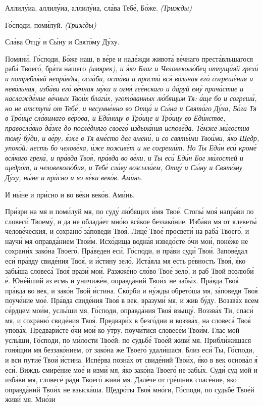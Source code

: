    Аллилу́иа, аллилу́иа, аллилу́иа, сла́ва Тебе́, Бо́же. \itshape (Трижды)\normalfont{}


   Го́споди, поми́луй. \itshape (Трижды)\normalfont{}


   Сла́ва Отцу́ и Сы́ну и Свято́му Ду́ху.


   Помяни́, Го́споди, Бо́же наш, в ве́ре и наде́жди живота́ ве́чнаго
преста́вльшагося раба́ Твоего́, бра́та на́шего \itshape (имярек)\normalfont{}, и я́ко Благ и
Человеколю́бец отпуща́яй грехи́ и потребля́яй непра́вды, осла́би, оста́ви и
прости́ вся́ во́льная его́ согреше́ния и нево́льная, изба́ви его́ ве́чная му́ки и
огня́ гее́нскаго и да́руй ему́ прича́стие и наслажде́ние ве́чных Твои́х благи́х,
угото́ванных лю́бящим Тя: а́ще бо и согреши́, но не отступи́ от Тебе́, и
несумне́нно во Отца́ и Сы́на и Свята́го Ду́ха, Бо́га Тя в Тро́ице сла́вимаго
ве́рова, и Еди́ницу в Тро́ице и Тро́ицу во Еди́нстве, правосла́вно да́же
до после́дняго своего́ издыха́ния испове́да. Те́мже ми́лостив тому́
бу́ди, и ве́ру, я́же в Тя вме́сто дел вмени́, и со святы́ми Твои́ми, я́ко
Щедр, упоко́й: несть бо челове́ка, и́же поживе́т и не согреши́т. Но Ты
Еди́н еси́ кроме́ вся́каго греха́, и пра́вда Твоя́, пра́вда во ве́ки, и Ты
еси́ Еди́н Бог ми́лостей и щедро́т, и человеколю́бия, и Тебе́ сла́ву
возсыла́ем, Отцу́ и Сы́ну и Свято́му Ду́ху, ны́не и при́сно и во ве́ки веко́в.
Ами́нь.


   И ны́не и при́сно и во ве́ки веко́в. Ами́нь.
   


   При́зри на мя и поми́луй мя, по суду́ лю́бящих и́мя Твое́. Стопы́ моя́
напра́ви по словеси́ Твоему́, и да не облада́ет мно́ю вся́кое беззако́ние.
Изба́ви мя от клеветы́ челове́ческия, и сохраню́ за́поведи Твоя́. Лице́ Твое́
просвети́ на раба́ Твоего́, и научи́ мя оправда́нием Твои́м. Исхо́дища водна́я
изведо́сте о́чи мои́, поне́же не сохрани́х зако́на Твоего́. Пра́веден еси́,
Го́споди, и пра́ви суди́ Твои́. Запове́дал еси́ пра́вду свиде́ния Твоя́, и и́стину
зело́. Иста́яла мя есть ре́вность Твоя́, я́ко забы́ша словеса́ Твоя́ врази́ мои́.
Разжже́но сло́во Твое́ зело́, и раб Твой возлюби́ е́. Юне́йший аз есмь и
уничиже́н, оправда́ний Твои́х не забы́х. Пра́вда Твоя́ пра́вда во век, и
зако́н Твой и́стина. Ско́рби и ну́жды обрето́ша мя, за́поведи Твоя́
поуче́ние мое́. Пра́вда свиде́ния Твоя́ в век, вразуми́ мя, и жив бу́ду.
Воззва́х всем се́рдцем мои́м, услы́ши мя, Го́споди, оправда́ния Твоя́
взыщу́. Воззва́х Ти, спаси́ мя, и сохраню́ свиде́ния Твоя́. Предвари́х в
безго́дии и воззва́х, на словеса́ Твоя́ упова́х. Предвари́сте о́чи мои́
ко у́тру, поучи́тися словесе́м Твои́м. Глас мой услы́ши, Го́споди, по
ми́лости Твое́й: по судьбе́ Твое́й живи́ мя. Прибли́жишася гоня́щии мя
беззако́нием, от зако́на же Твоего́ удали́шася. Близ еси́ Ты, Го́споди, и вси
путие́ Твои́ и́стина. Испе́рва позна́х от свиде́ний Твои́х, я́ко в век
основа́л я́ еси́. Виждь смире́ние мое́ и изми́ мя, я́ко зако́на Твоего́
не забы́х. Суди́ суд мой и изба́ви мя, словесе́ ра́ди Твоего́ живи́ мя.
Дале́че от гре́шник спасе́ние, я́ко оправда́ний Твои́х не взыска́ша.
Щедро́ты Твоя́ мно́ги, Го́споди, по судьбе́ Твое́й живи́ мя. Мно́зи

